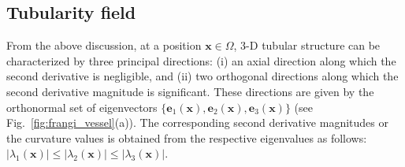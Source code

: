 \subsection{Tubularity field}
From the above discussion, at a position $\textbf{x}\in \Omega$, 3-D tubular structure can be characterized by three principal directions:
(i) an axial direction along which the second derivative is negligible, and (ii) two orthogonal directions along which the second derivative magnitude is significant. These directions are given by the orthonormal set of eigenvectors $\{\textbf{e}_1\left(\textbf{x}\right),\textbf{e}_2\left(\textbf{x}\right),\textbf{e}_3\left(\textbf{x}\right)\}$ (see Fig.~\ref{fig:frangi_vessel}(a)). The corresponding second derivative magnitudes or the curvature values is obtained from the respective eigenvalues as follows: $|\lambda_1(\textbf{x})|\leq{|\lambda_2(\textbf{x})|\leq{|\lambda_3(\textbf{x})|}}$.
